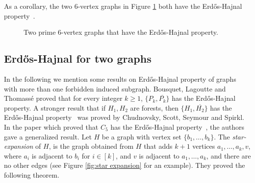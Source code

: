 \documentclass[a4paper,11pt]{article}
\begin{document}
As a corollary, the two 6-vertex graphs in Figure \ref{fig:6-vertex-E-H}  both have the Erd\H{o}s-Hajnal property~\cite{NSS232}.

\begin{figure}[h!]
\centering
{}
\hspace{10mm}
\caption{Two prime 6-vertex graphs that have the Erd\H{o}s-Hajnal property.}
\label{fig:6-vertex-E-H}
\end{figure}


\subsection{Erd\H{o}s-Hajnal for two graphs}

In the following we mention some results on Erd\H{o}s-Hajnal property of graphs with more than one forbidden induced subgraph. 
Bousquet, Lagoutte and Thomass\'{e} \cite{BLT15} proved that for every integer $k\geq 1$, $\{P_k,\overline{P_k}\}$ has the Erd\H{o}s-Hajnal property. 
A stronger result that if $H_1,H_2$ are forests, then $\{H_1,\overline{H_2}\}$ has the Erd\H{o}s-Hajnal property~\cite{CSSS20} was proved by Chudnovsky, Scott, Seymour and Spirkl. In the paper which proved that $C_5$ has the Erd\H{o}s-Hajnal property~\cite{CSSS23}, the authors gave a generalized result. Let $H$ be a graph with vertex set $\{b_1,\ldots,b_k\}$. The {\em star-expansion} of $H$, is the graph obtained from $H$ that adds $k+1$ vertices $a_1,\ldots,a_k,v$, where $a_i$ is adjacent to $b_i$ for $i\in[k]$, and $v$ is adjacent to $a_1,\ldots,a_k$, and there are no other edges (see Figure \ref{fig:star expansion} for an example). They proved the following theorem.
\end{document}
